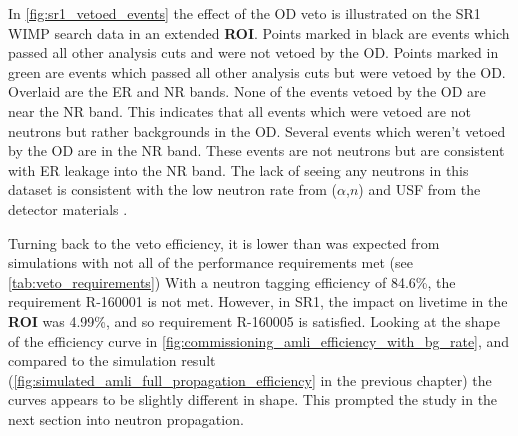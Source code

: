 %



\par
In \autoref{fig:sr1_vetoed_events} the effect of the OD veto is illustrated on the SR1 WIMP search data in an extended \textbf{ROI}.
Points marked in black are events which passed all other analysis cuts and were not vetoed by the OD.
Points marked in green are events which passed all other analysis cuts but were vetoed by the OD.
Overlaid are the ER and NR bands.
None of the events vetoed by the OD are near the NR band.
This indicates that all events which were vetoed are not neutrons but rather backgrounds in the OD.
Several events which weren't vetoed by the OD are in the NR band.
These events are not neutrons but are consistent with ER leakage into the NR band.
The lack of seeing any neutrons in this dataset is consistent with the low neutron rate from ($\alpha$,$n$) and USF from the detector materials \cite{LZ_TechnicalDesignReview_ref}.



\par
Turning back to the veto efficiency, it is lower than was expected from simulations with not all of the performance requirements met (see \autoref{tab:veto_requirements})
With a neutron tagging efficiency of 84.6\%, the requirement R-160001 is not met.
However, in SR1, the impact on livetime in the \textbf{ROI} was 4.99\%, and so requirement R-160005 is satisfied.
Looking at the shape of the efficiency curve in \autoref{fig:commissioning_amli_efficiency_with_bg_rate}, and compared to the simulation result (\autoref{fig:simulated_amli_full_propagation_efficiency} in the previous chapter) the curves appears to be slightly different in shape.
This prompted the study in the next section into neutron propagation.

